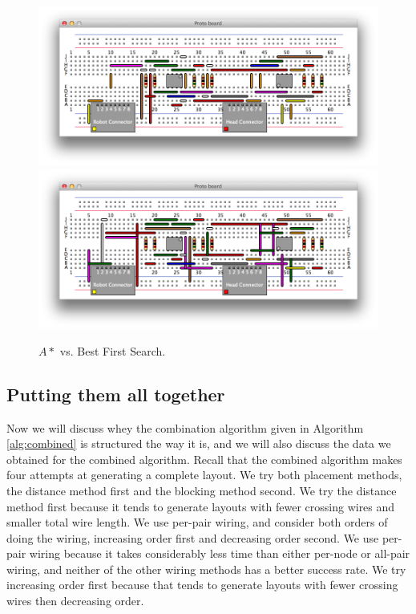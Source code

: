 \begin{figure}
\begin{center}
\includegraphics[width=\textwidth]{Images/exemplar_per_pair_decreasing.png}
\includegraphics[width=\textwidth]{Images/exemplar_best_first.png}
\caption{$A*$ vs. Best First Search.}
\end{center}
\end{figure}

\subsection{Putting them all together}
\label{sec:method_combination}

Now we will discuss whey the combination algorithm given in Algorithm
\ref{alg:combined} is structured the way it is, and we will also
discuss the data we obtained for the combined algorithm. Recall that the combined
algorithm makes four attempts at generating a complete layout. We try both
placement methods, the distance method first and the blocking method second. We
try the distance method first because it tends to generate layouts with fewer
crossing wires and smaller total wire length. We use per-pair wiring, and
consider both orders of doing the wiring, increasing order first and decreasing
order second. We use per-pair wiring because it takes considerably
less time than either per-node or all-pair wiring, and neither of the other
wiring methods has a better success rate. We try increasing order first because
that tends to generate layouts with fewer crossing wires then decreasing order.

